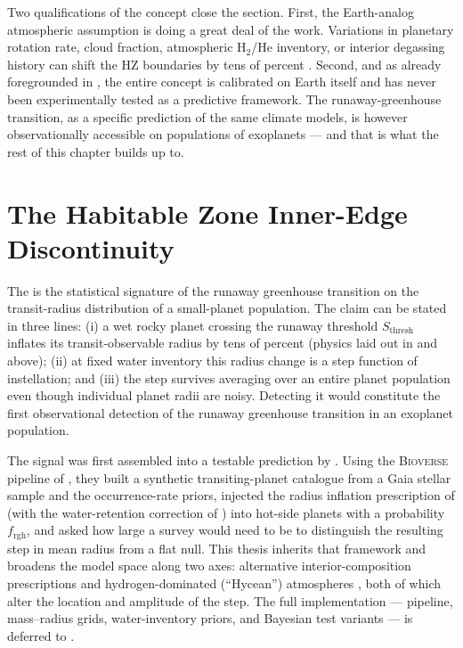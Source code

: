 Two qualifications of the concept close the section.  First, the
Earth-analog atmospheric assumption is doing a great deal of the
work.  Variations in planetary rotation rate, cloud fraction,
atmospheric H$_2$/He inventory, or interior degassing history can
shift the HZ boundaries by tens of percent
\parencite{Turbet2021,Chaverot2023}.  Second, and as already
foregrounded in , the entire concept is
calibrated on Earth itself and has never been experimentally tested
as a predictive framework.  The runaway-greenhouse transition, as a
specific prediction of the same climate models, is however
observationally accessible on populations of exoplanets --- and that
is what the rest of this chapter builds up to.


\section{The Habitable Zone Inner-Edge Discontinuity}
\label{sec:hzied_framework}

The \HZIED is the statistical signature of the runaway greenhouse
transition on the transit-radius distribution of a small-planet
population.  The claim can be stated in three lines: (i) a wet rocky
planet crossing the runaway threshold $S_\mathrm{thresh}$ inflates
its transit-observable radius by tens of percent (physics laid out in
 and  above); (ii) at
fixed water inventory this radius change is a step function of
instellation; and (iii) the step survives averaging over an entire
planet population even though individual planet radii are noisy.
Detecting it would constitute the first observational detection of
the runaway greenhouse transition in an exoplanet population.

The signal was first assembled into a testable prediction by
\textcite{Schlecker2024}.  Using the \textsc{Bioverse} pipeline of
\textcite{BixelApai2021}, they built a synthetic transiting-planet
catalogue from a Gaia stellar sample and the \textcite{Bergsten2022}
occurrence-rate priors, injected the radius inflation prescription of
\textcite{Turbet2020} (with the water-retention correction of
\textcite{DornLichtenberg2021}) into hot-side planets with a
probability $f_\mathrm{rgh}$, and asked how large a survey would need
to be to distinguish the resulting step in mean radius from a flat
null.  This thesis inherits that framework and broadens the model
space along two axes: alternative interior-composition prescriptions
\parencite{Aguichine2021} and hydrogen-dominated (``Hycean'')
atmospheres \parencite{Pierrehumbert2022,Innes2023}, both of which
alter the location and amplitude of the step.  The full
implementation --- pipeline, mass--radius grids, water-inventory
priors, and Bayesian test variants --- is deferred to
.

